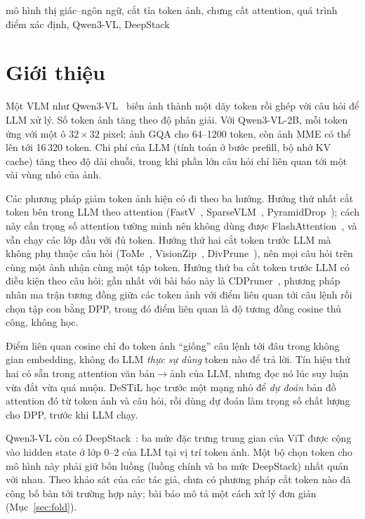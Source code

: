 \documentclass[conference]{IEEEtran}
\begin{document}
\begin{IEEEkeywords}
mô hình thị giác--ngôn ngữ, cắt tỉa token ảnh, chưng cất attention, quá trình điểm xác định, Qwen3-VL, DeepStack
\end{IEEEkeywords}

\section{Giới thiệu}
\label{sec:intro}

Một VLM như Qwen3-VL~\cite{qwen2025qwen3vl} biến ảnh thành một dãy token rồi ghép với câu hỏi để LLM xử lý. Số token ảnh tăng theo độ phân giải. Với Qwen3-VL-2B, mỗi token ứng với một ô $32\times32$ pixel; ảnh GQA cho 64--1200 token, còn ảnh MME có thể lên tới 16\,320 token. Chi phí của LLM (tính toán ở bước prefill, bộ nhớ KV cache) tăng theo độ dài chuỗi, trong khi phần lớn câu hỏi chỉ liên quan tới một vài vùng nhỏ của ảnh.

Các phương pháp giảm token ảnh hiện có đi theo ba hướng. Hướng thứ nhất cắt token bên trong LLM theo attention (FastV~\cite{chen2024fastv}, SparseVLM~\cite{zhang2025sparsevlm}, PyramidDrop~\cite{xing2025pyramiddrop}); cách này cần trọng số attention tường minh nên không dùng được FlashAttention~\cite{dao2024flashattention2}, và vẫn chạy các lớp đầu với đủ token. Hướng thứ hai cắt token trước LLM mà không phụ thuộc câu hỏi (ToMe~\cite{bolya2023tome}, VisionZip~\cite{yang2025visionzip}, DivPrune~\cite{alvar2025divprune}), nên mọi câu hỏi trên cùng một ảnh nhận cùng một tập token. Hướng thứ ba cắt token trước LLM có điều kiện theo câu hỏi; gần nhất với bài báo này là CDPruner~\cite{zhang2025cdpruner}, phương pháp nhân ma trận tương đồng giữa các token ảnh với điểm liên quan tới câu lệnh rồi chọn tập con bằng DPP, trong đó điểm liên quan là độ tương đồng cosine thủ công, không học.

Điểm liên quan cosine chỉ đo token ảnh ``giống'' câu lệnh tới đâu trong không gian embedding, không đo LLM \emph{thực sự dùng} token nào để trả lời. Tín hiệu thứ hai có sẵn trong attention văn bản$\rightarrow$ảnh của LLM, nhưng đọc nó lúc suy luận vừa đắt vừa quá muộn. DeSTiL học trước một mạng nhỏ để \emph{dự đoán} bản đồ attention đó từ token ảnh và câu hỏi, rồi dùng dự đoán làm trọng số chất lượng cho DPP, trước khi LLM chạy.

Qwen3-VL còn có DeepStack~\cite{meng2024deepstack}: ba mức đặc trưng trung gian của ViT được cộng vào hidden state ở lớp 0--2 của LLM tại vị trí token ảnh. Một bộ chọn token cho mô hình này phải giữ bốn luồng (luồng chính và ba mức DeepStack) nhất quán với nhau. Theo khảo sát của các tác giả, chưa có phương pháp cắt token nào đã công bố bàn tới trường hợp này; bài báo mô tả một cách xử lý đơn giản (Mục~\ref{sec:fold}).
\end{document}

